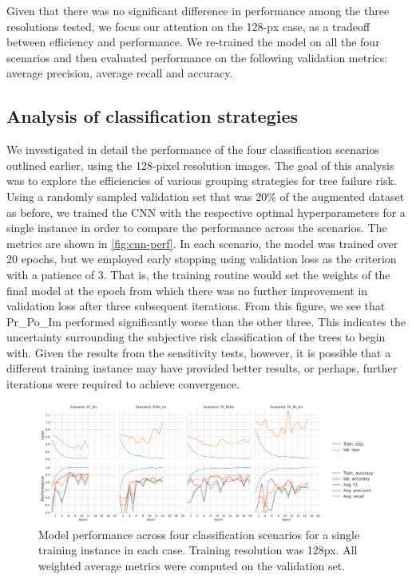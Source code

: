 \documentclass[Journal,letterpaper, SingleSpace, InsideFigs]{ascelike-new}
\begin{document}
Given that there was no significant difference in performance among the three resolutions tested, we focus our attention on the 128-px case, as a tradeoff between efficiency and performance. We re-trained the model on all the four scenarios and then evaluated performance on the following validation metrics: average precision, average recall and accuracy.


\subsection{Analysis of classification strategies}
We investigated in detail the performance of the four classification scenarios outlined earlier, using the 128-pixel resolution images.
The goal of this analysis was to explore the efficiencies of various grouping strategies for tree failure risk.
Using a randomly sampled validation set that was 20\% of the augmented dataset as before, we trained the CNN with the respective optimal hyperparameters for a single instance in order to compare the performance across the scenarios. The metrics are shown in \autoref{fig:cnn-perf}.
In each scenario, the model was trained over 20 epochs, but we employed early stopping using validation loss as the criterion with a patience of 3. That is, the training routine would set the weights of the final model at the epoch from which there was no further improvement in validation loss after three subsequent iterations. From this figure, we see that Pr\_Po\_Im performed significantly worse than the other three. This indicates the uncertainty surrounding the subjective risk classification of the trees to begin with. Given the results from the sensitivity tests, however, it is possible that a different training instance may have provided better results, or perhaps, further iterations were required to achieve convergence.

\begin{figure}[ht]
    \centering
    \includegraphics[width=1.05\textwidth]{cnn-performance-metrics-128px-plot}
    \caption{Model performance across four classification scenarios for a single training instance in each case. Training resolution was 128px. All weighted average metrics were computed on the validation set.}
    \label{fig:cnn-perf}
\end{figure}
\end{document}
